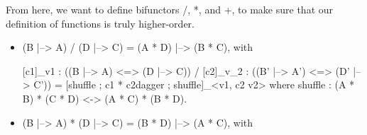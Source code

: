 \documentclass{sigplanconf}
\begin{document}
From here, we want to define bifunctors {{/}}, {{*}}, and {{+}}, to make sure
that our definition of functions is truly higher-order.

\begin{itemize}

\item {{(B |--> A) / (D |--> C) = (A * D) |--> (B * C)}}, with

{{{[c1]}_{v1} : ((B |--> A) <=> (D |--> C)) / {[c2]}_{v_2} : ((B' |--> A') <=> (D' |--> C')) = {[shuffle ; c1 * c2dagger ; shuffle]}_{<v1, c2 v2>}}}
where
{{shuffle : (A * B) * (C * D) <-> (A * C) * (B * D)}}.

\item {{(B |--> A) * (D |--> C) = (B * D) |--> (A * C)}}, with

\end{itemize}





\end{document}

